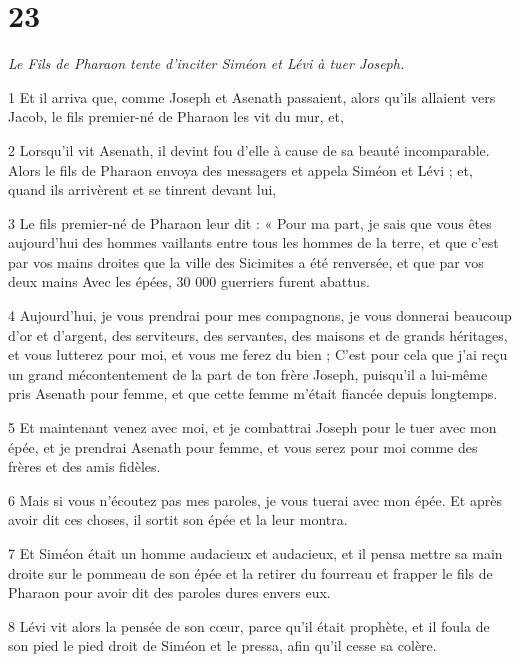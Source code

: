 \chapter{23}

\par \textit{Le Fils de Pharaon tente d'inciter Siméon et Lévi à tuer Joseph.}


\par 1 Et il arriva que, comme Joseph et Asenath passaient, alors qu'ils allaient vers Jacob, le fils premier-né de Pharaon les vit du mur, et,

\par 2 Lorsqu'il vit Asenath, il devint fou d'elle à cause de sa beauté incomparable. Alors le fils de Pharaon envoya des messagers et appela Siméon et Lévi ; et, quand ils arrivèrent et se tinrent devant lui,

\par 3 Le fils premier-né de Pharaon leur dit : « Pour ma part, je sais que vous êtes aujourd'hui des hommes vaillants entre tous les hommes de la terre, et que c'est par vos mains droites que la ville des Sicimites a été renversée, et que par vos deux mains Avec les épées, 30 000 guerriers furent abattus.

\par 4 Aujourd'hui, je vous prendrai pour mes compagnons, je vous donnerai beaucoup d'or et d'argent, des serviteurs, des servantes, des maisons et de grands héritages, et vous lutterez pour moi, et vous me ferez du bien ; C'est pour cela que j'ai reçu un grand mécontentement de la part de ton frère Joseph, puisqu'il a lui-même pris Asenath pour femme, et que cette femme m'était fiancée depuis longtemps.

\par 5 Et maintenant venez avec moi, et je combattrai Joseph pour le tuer avec mon épée, et je prendrai Asenath pour femme, et vous serez pour moi comme des frères et des amis fidèles.

\par 6 Mais si vous n’écoutez pas mes paroles, je vous tuerai avec mon épée. Et après avoir dit ces choses, il sortit son épée et la leur montra.

\par 7 Et Siméon était un homme audacieux et audacieux, et il pensa mettre sa main droite sur le pommeau de son épée et la retirer du fourreau et frapper le fils de Pharaon pour avoir dit des paroles dures envers eux.

\par 8 Lévi vit alors la pensée de son cœur, parce qu'il était prophète, et il foula de son pied le pied droit de Siméon et le pressa, afin qu'il cesse sa colère.


